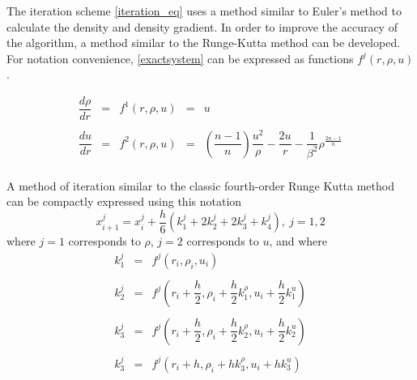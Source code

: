 \documentclass[11pt,letterpaper]{article}
\begin{document}
The iteration scheme \eqref{iteration_eq} uses a method similar to Euler's
method to calculate the density and density gradient. In order to improve the
accuracy of the algorithm, a method similar to the Runge-Kutta method can be
developed. For notation convenience, \eqref{exactsystem} can be expressed as
functions $f^j\left(r, \rho, u\right)$.

\begin{equation}
    \begin{array}{rcccl}
        \dfrac{d\rho}{dr} & = & f^1\left(r, \rho, u \right) & = & u\\
        \ \\
        \dfrac{du}{dr} & = & f^2\left(r, \rho, u\right) & = &
        \left(\dfrac{n-1}{n}\right)\dfrac{u^2}{\rho}
        -\dfrac{2u}{r} -\dfrac{1}{\beta^2} \rho^\frac{2n-1}{n} \\
    \end{array}
\end{equation}

A method of iteration similar to the classic fourth-order Runge Kutta method can
be compactly expressed using this notation
\begin{equation}
    x^j_{i+1} =
    x^j_i + \frac{h}{6} \left(k^j_1 + 2k^j_2 + 2k^j_3 + k^j_4\right),
    \ j = 1,2
    \label{rungekutta4}
\end{equation}
where $j=1$ corresponds to $\rho$, $j=2$ corresponds to $u$, and where
\begin{equation} %
    \begin{array}{rcl}
        k^j_1 & = & 
            f^j\left(
                r_i,
                \rho_i,
                u_i
            \right) \\
        \ \\ %
        k^j_2 & = &
            f^j\left(
                r_i    + \dfrac{h}{2},
                \rho_i + \dfrac{h}{2} k^\rho_1,
                u_i    + \dfrac{h}{2} k^u_1
            \right) \\
        \ \\
        k^j_3 & = &
            f^j\left(
                r_i    + \dfrac{h}{2},
                \rho_i + \dfrac{h}{2} k^\rho_2,
                u_i    + \dfrac{h}{2} k^u_2
            \right) \\
        \ \\
        k^j_3 & = &
            f^j\left(
                r_i    + h,
                \rho_i + h k^\rho_3,
                u_i    + h k^u_3
            \right) \\
    \end{array}
    \label{rk4coefs}
\end{equation}
\end{document}
